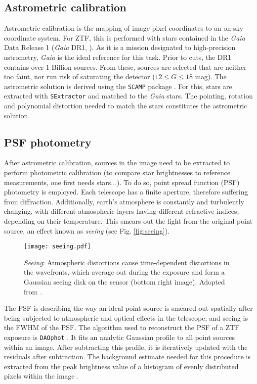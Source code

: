 \subsection{Astrometric calibration}
Astrometric calibration is the mapping of image pixel coordinates to an on-sky coordinate system. For ZTF, this is performed with stars contained in the \textit{Gaia} Data Release 1 (\textit{Gaia} DR1, ). As it is a mission designated to high-precision astrometry, \textit{Gaia} is the ideal reference for this task. Prior to cuts, the DR1 contains over 1 Billion sources. From these, sources are selected that are neither too faint, nor run risk of saturating the detector ($12 \leq G \leq 18$ mag). The astrometric solution is derived using the \texttt{SCAMP}  package . For this, stars are extracted with \texttt{SExtractor}  and matched to the \textit{Gaia} stars. The pointing, rotation and polynomial distortion needed to match the stars constitutes the astrometric solution.

\subsection{PSF photometry} \label{psfphot}
After astrometric calibration, sources in the image need to be extracted to perform photometric calibration (to compare star brightnesses to reference measurements, one first needs stars...). To do so, point spread function (PSF) photometry is employed. Each telescope has a finite aperture, therefore suffering from diffraction. Additionally, earth's atmosphere is constantly and turbulently changing, with different atmospheric layers having different refractive indices, depending on their temperature. This smears out the light from the original point source, an effect known as \textit{seeing} (see Fig. \ref{fig:seeing}).

\begin{figure}[h!]
    \texttt{[image: seeing.pdf]}
    \caption[Seeing]{\textit{Seeing}: Atmospheric distortions cause time-dependent distortions in the wavefronts, which average out during the exposure and form a Gaussian seeing disk on the sensor (bottom right image). Adopted from \cite{Chromey2016}.}
\end{figure}

The PSF is describing the way an ideal point source is smeared out spatially after being subjected to atmospheric and optical effects in the telescope, and seeing is the FWHM of the PSF. The algorithm used to reconstruct the PSF of a ZTF exposure is \texttt{DAOphot} . It fits an analytic Gaussian profile to all point sources within an image. After subtracting this profile, it is iteratively updated with the residuals after subtraction. The background estimate needed for this procedure is extracted from the peak brightness value of a histogram of evenly distributed pixels within the image \cite{Stetson1987}.

